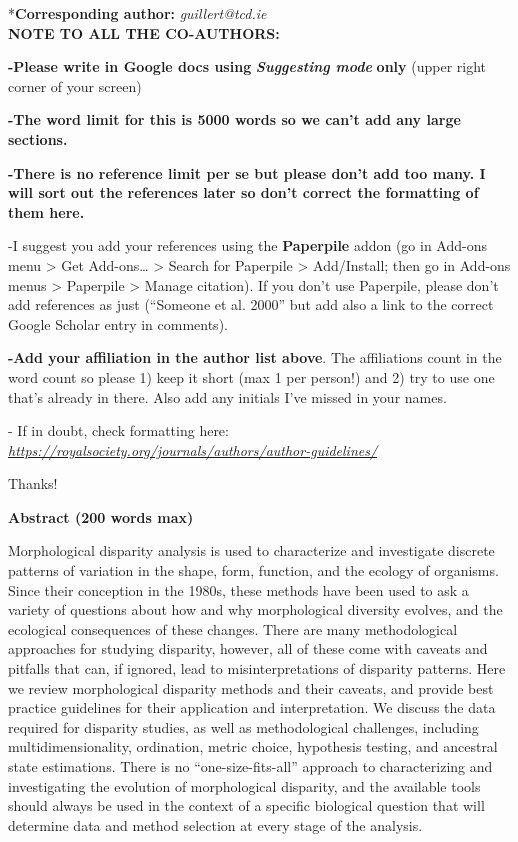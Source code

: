 *\textbf{Corresponding author: }\emph{guillert@tcd.ie}\\

\textbf{NOTE TO ALL THE CO-AUTHORS:}

\textbf{-Please write in Google docs using }\emph{\textbf{Suggesting
mode}}\textbf{ only }(upper right corner of your screen)

\textbf{-The word limit for this is 5000 words so we can't add any large
sections.}

\textbf{-There is no reference limit per se but please don't add too
many. I will sort out the references later so don't correct the
formatting of them here.}

-I suggest you add your references using the \textbf{Paperpile} addon
(go in Add-ons menu \textgreater{} Get Add-ons\ldots{} \textgreater{}
Search for Paperpile \textgreater{} Add/Install; then go in Add-ons
menus \textgreater{} Paperpile \textgreater{} Manage citation). If you
don't use Paperpile, please don't add references as just (``Someone et
al. 2000'' but add also a link to the correct Google Scholar entry in
comments).

\textbf{-Add your affiliation in the author list above}. The
affiliations count in the word count so please 1) keep it short (max 1
per person!) and 2) try to use one that's already in there. Also add any
initials I've missed in your names.

- If in doubt, check formatting here:
\href{https://royalsociety.org/journals/authors/author-guidelines/}{\emph{https://royalsociety.org/journals/authors/author-guidelines/}}

Thanks!

\textbf{Abstract (200 words max)}

Morphological disparity analysis is used to characterize and investigate
discrete patterns of variation in the shape, form, function, and the
ecology of organisms. Since their conception in the 1980s, these methods
have been used to ask a variety of questions about how and why
morphological diversity evolves, and the ecological consequences of
these changes. There are many methodological approaches for studying
disparity, however, all of these come with caveats and pitfalls that
can, if ignored, lead to misinterpretations of disparity patterns. Here
we review morphological disparity methods and their caveats, and provide
best practice guidelines for their application and interpretation. We
discuss the data required for disparity studies, as well as
methodological challenges, including multidimensionality, ordination,
metric choice, hypothesis testing, and ancestral state estimations.
There is no ``one-size-fits-all'' approach to characterizing and
investigating the evolution of morphological disparity, and the
available tools should always be used in the context of a specific
biological question that will determine data and method selection at
every stage of the analysis.

